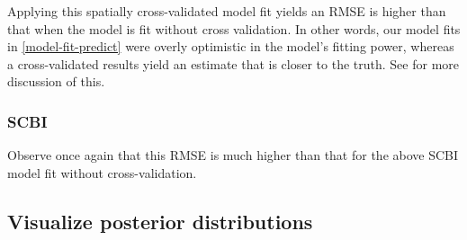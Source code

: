 \documentclass[12pt]{article}
\newenvironment{Shaded}{\begin{snugshade}}{\end{snugshade}}
\newcommand{\CommentTok}[1]{\textcolor[rgb]{0.56,0.35,0.01}{\textit{#1}}}
\newcommand{\DataTypeTok}[1]{\textcolor[rgb]{0.13,0.29,0.53}{#1}}
\newcommand{\KeywordTok}[1]{\textcolor[rgb]{0.13,0.29,0.53}{\textbf{#1}}}
\newcommand{\NormalTok}[1]{#1}
\newcommand{\OperatorTok}[1]{\textcolor[rgb]{0.81,0.36,0.00}{\textbf{#1}}}
\newcommand{\StringTok}[1]{\textcolor[rgb]{0.31,0.60,0.02}{#1}}
\begin{document}
Applying this spatially cross-validated model fit yields an RMSE is
higher than that when the model is fit without cross validation. In
other words, our model fits in \ref{model-fit-predict} were overly
optimistic in the model's fitting power, whereas a cross-validated
results yield an estimate that is closer to the truth. See
\citet{allen_permutation_2020} for more discussion of this.

\begin{Shaded}
\end{Shaded}

\hypertarget{scbi-4}{%
\subsubsection{SCBI}\label{scbi-4}}

Observe once again that this RMSE is much higher than that for the above
SCBI model fit without cross-validation.

\begin{Shaded}
\end{Shaded}

\hypertarget{viz-posterior-distributions}{%
\subsection{Visualize posterior
distributions}\label{viz-posterior-distributions}}
\end{document}
